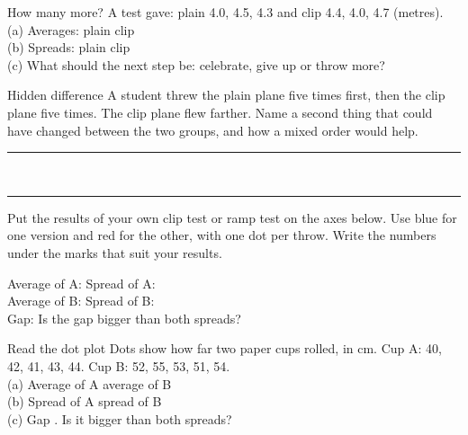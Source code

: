 \begin{puzzle}{How many more?}
A test gave: plain 4.0, 4.5, 4.3 and clip 4.4, 4.0, 4.7 (metres).\\
(a) Averages: plain \wline[1.3cm] clip \wline[1.3cm]\\
(b) Spreads: plain \wline[1.3cm] clip \wline[1.3cm]\\
(c) What should the next step be: celebrate, give up or throw more? \wline[2.6cm]
\end{puzzle}

\begin{puzzle}{Hidden difference}
A student threw the plain plane five times first, then the clip plane five times. The clip plane flew farther. Name a second thing that could have changed between the two groups, and how a mixed order would help.\\
\rule{\linewidth}{0.5pt}\\[4pt]\rule{\linewidth}{0.5pt}
\end{puzzle}
\clearpage

Put the results of your own clip test or ramp test on the axes below. Use blue for one version and red for the other, with one dot per throw. Write the numbers under the marks that suit your results.

\begin{center}
\end{center}

Average of A: \wline[1.6cm] \quad Spread of A: \wline[1.6cm]\\[8pt]
Average of B: \wline[1.6cm] \quad Spread of B: \wline[1.6cm]\\[8pt]
Gap: \wline[1.6cm] \quad Is the gap bigger than both spreads? \wline[1.6cm]

\begin{puzzle}{Read the dot plot}
Dots show how far two paper cups rolled, in cm. Cup A: 40, 42, 41, 43, 44. Cup B: 52, 55, 53, 51, 54.\\
(a) Average of A \wline[1.3cm] average of B \wline[1.3cm]\\
(b) Spread of A \wline[1.3cm] spread of B \wline[1.3cm]\\
(c) Gap \wline[1.3cm]. Is it bigger than both spreads? \wline[1.6cm]
\end{puzzle}
\clearpage


